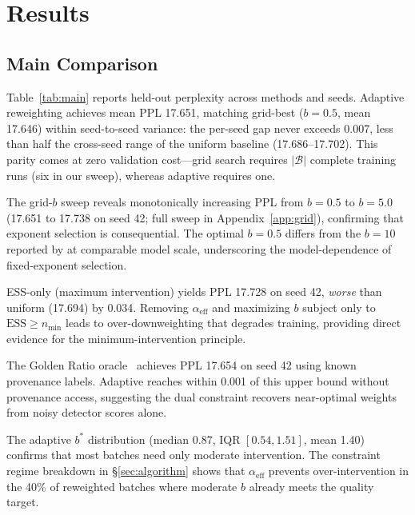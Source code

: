 \section{Results}
\label{sec:results}

\subsection{Main Comparison}

Table~\ref{tab:main} reports held-out perplexity across methods and seeds.
Adaptive reweighting achieves mean PPL 17.651, matching grid-best ($b{=}0.5$, mean 17.646) within seed-to-seed variance: the per-seed gap never exceeds 0.007, less than half the cross-seed range of the uniform baseline (17.686--17.702).
This parity comes at zero validation cost---grid search requires $|\mathcal{B}|$ complete training runs (six in our sweep), whereas adaptive requires one.

The grid-$b$ sweep reveals monotonically increasing PPL from $b{=}0.5$ to $b{=}5.0$ (17.651 to 17.738 on seed 42; full sweep in Appendix~\ref{app:grid}), confirming that exponent selection is consequential.
The optimal $b{=}0.5$ differs from the $b{=}10$ reported by \citet{drayson_2025_detection_collapse} at comparable model scale, underscoring the model-dependence of fixed-exponent selection.

ESS-only (maximum intervention) yields PPL 17.728 on seed 42, \emph{worse} than uniform (17.694) by 0.034.
Removing $\alpha_{\mathrm{eff}}$ and maximizing $b$ subject only to $\mathrm{ESS} \geq n_{\min}$ leads to over-downweighting that degrades training, providing direct evidence for the minimum-intervention principle.

The Golden Ratio oracle~\citep{he_2025_golden_ratio} achieves PPL 17.654 on seed 42 using known provenance labels.
Adaptive reaches within 0.001 of this upper bound without provenance access, suggesting the dual constraint recovers near-optimal weights from noisy detector scores alone.

The adaptive $b^*$ distribution (median 0.87, IQR $[0.54, 1.51]$, mean 1.40) confirms that most batches need only moderate intervention.
The constraint regime breakdown in \S\ref{sec:algorithm} shows that $\alpha_{\mathrm{eff}}$ prevents over-intervention in the 40\% of reweighted batches where moderate $b$ already meets the quality target.

